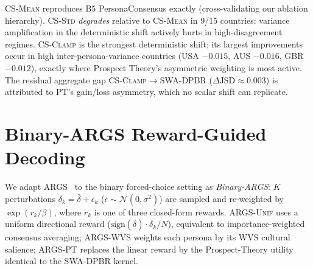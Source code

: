 \documentclass{article}
\begin{document}
\textsc{CS-Mean} reproduces B5 PersonaConsensus exactly (cross-validating our
ablation hierarchy). \textsc{CS-Std} \emph{degrades} relative to \textsc{CS-Mean}
in 9/15 countries: variance amplification in the deterministic shift actively
hurts in high-disagreement regimes. \textsc{CS-Clamp} is the strongest
deterministic shift; its largest improvements occur in high inter-persona-variance
countries (USA $-0.015$, AUS $-0.016$, GBR $-0.012$), exactly where Prospect
Theory's asymmetric weighting is most active. The residual aggregate gap
\textsc{CS-Clamp}$\to$SWA-DPBR ($\Delta\text{JSD}\approx0.003$) is attributed to
PT's gain/loss asymmetry, which no scalar shift can replicate.

\section{Binary-ARGS Reward-Guided Decoding}
\label{app:args}

We adapt ARGS~\citep{khanov2024args} to the binary forced-choice setting as
\emph{Binary-ARGS}: $K$ perturbations $\delta_k=\bar\delta+\epsilon_k$
($\epsilon\!\sim\!\mathcal{N}(0,\sigma^2)$) are sampled and re-weighted by
$\exp(r_k/\beta)$, where $r_k$ is one of three closed-form rewards.
\textsc{ARGS-Unif} uses a uniform directional reward
($\text{sign}(\bar\delta)\cdot\delta_k/N$), equivalent to importance-weighted
consensus averaging; \textsc{ARGS-WVS} weights each persona by its WVS cultural
salience; \textsc{ARGS-PT} replaces the linear reward by the Prospect-Theory
utility identical to the SWA-DPBR kernel.
\end{document}
